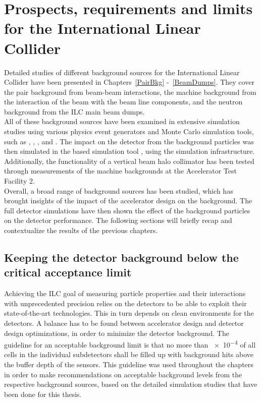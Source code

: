 \chapter{Prospects, requirements and limits for the International Linear Collider}
\label{Results}
Detailed studies of different background sources for the International Linear Collider have been presented in Chapters~\ref{PairBkg} -~\ref{BeamDumps}.
They cover the \positron\electron pair background from beam-beam interactions, the machine background from the interaction of the beam with the beam line components, and the neutron background from the ILC main beam dumps.
\\All of these background sources have been examined in extensive simulation studies using various physics event generators and Monte Carlo simulation tools, such as \guineapig, \mucarlo, \bdsim, and \fluka.
The impact on the \sid detector from the background particles was then simulated in the \geant based simulation tool \slic, using the \sid simulation infrastructure.
Additionally, the functionality of a vertical beam halo collimator has been tested through measurements of the machine backgrounds at the Accelerator Test Facility 2.
\\Overall, a broad range of background sources has been studied, which has brought insights of the impact of the accelerator design on the background.
The full detector simulations have then shown the effect of the background particles on the \sid detector performance.
The following sections will briefly recap and contextualize the results of the previous chapters.

\section{Keeping the detector background below the critical acceptance limit}
Achieving the ILC goal of measuring particle properties and their interactions with unprecedented precision relies on the detectors to be able to exploit their state-of-the-art technologies.
This in turn depends on clean environments for the detectors.
A balance has to be found between accelerator design and detector design optimizations, in order to minimize the detector background.
The \sid guideline for an acceptable background limit is that no more than \num{e-4} of all cells in the individual subdetectors shall be filled up with background hits above the buffer depth of the sensors.
This guideline was used throughout the chapters in order to make recommendations on acceptable background levels from the respective background sources, based on the detailed simulation studies that have been done for this thesis.

